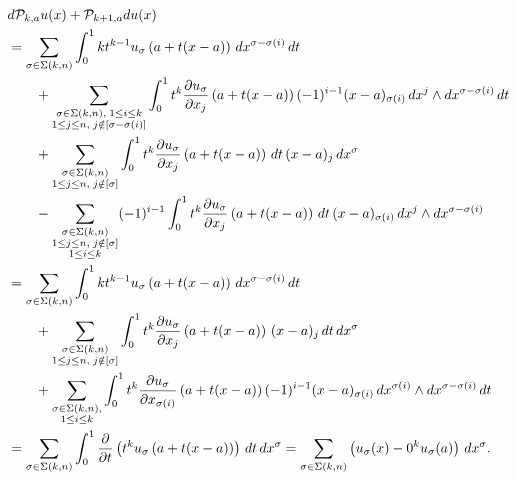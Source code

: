 \documentclass[10pt,a4paper]{article}
\begin{document}
\begin{align*}
    &
    d {\mathcal P}_{k,a} u(x)
    +
    {\mathcal P}_{k+1,a} d u(x)
    \\&
    =
    \sum_{\sigma \in \Sigma(k,n)} 
    \int_{0}^{1} 
    k t^{k-1} u_{\sigma}\left(a+t(x-a)\right) \,dx^{\sigma-\sigma(i)} \,dt 
    \\&\qquad
    + 
    \sum_{\substack{ \sigma \in \Sigma(k,n), \; 1 \leq i \leq k \\ 1 \leq j \leq n, \; j \notin [\sigma-\sigma(i)] }}
    \int_{0}^{1} 
    t^{k} \frac{ \partial u_{\sigma} }{\partial x_{j}}\left(a+t(x-a)\right) (-1)^{i-1} (x-a)_{\sigma(i) } \,dx^{j} \wedge dx^{\sigma-\sigma(i)} \,dt 
    \\&\qquad
    +
    \sum_{\substack{ \sigma \in \Sigma(k,n) \\ 1 \leq j \leq n, \; j \notin [\sigma] }} 
    \int_{0}^{1} t^{k} \frac{ \partial u_{\sigma} }{\partial x_{j}}\left(a+t(x-a)\right) \,dt \,(x-a)_{j} \,dx^{\sigma}
    \\&\qquad
    - 
    \sum_{\substack{ \sigma \in \Sigma(k,n) \\ 1 \leq j \leq n, \; j \notin [\sigma] \\ 1 \leq i \leq k }}
    (-1)^{i-1}
    \int_{0}^{1} t^{k} \frac{ \partial u_{\sigma} }{\partial x_{j}}\left(a+t(x-a)\right) \,dt 
    \,(x-a)_{\sigma(i)} \,dx^{j} \wedge dx^{\sigma-\sigma(i)}
    \\&
    =
    \sum_{\sigma \in \Sigma(k,n)} 
    \int_{0}^{1} 
    k t^{k-1} u_{\sigma}\left(a+t(x-a)\right) \,dx^{\sigma-\sigma(i)} \,dt 
    \\&\qquad
    +
    \sum_{\substack{ \sigma \in \Sigma(k,n) \\ 1 \leq j \leq n, \; j \notin [\sigma] }} 
    \int_{0}^{1} t^{k} \frac{ \partial u_{\sigma} }{\partial x_{j}}\left(a+t(x-a)\right) \,(x-a)_{j} \,dt \,dx^{\sigma}
    \\&\qquad
    + 
    \sum_{\substack{ \sigma \in \Sigma(k,n), \\ 1 \leq i \leq k }}
    \int_{0}^{1} 
    t^{k} \frac{ \partial u_{\sigma} }{\partial x_{\sigma(i)}}\left(a+t(x-a)\right) (-1)^{i-1} (x-a)_{\sigma(i) } \,dx^{\sigma(i)} \wedge dx^{\sigma-\sigma(i)} \,dt 
    \\&
    =
    \sum_{\sigma \in \Sigma(k,n)} 
    \int_{0}^{1} \frac{\partial}{\partial t} \left( t^{k} u_{\sigma}\left(a+t(x-a)\right) \right) \,dt \,dx^{\sigma}
    =
    \sum_{\sigma \in \Sigma(k,n)} 
    \left( u_{\sigma}(x) - 0^k u_{\sigma}(a) \right) \,dx^{\sigma}
    .
\end{align*}
\end{document}
